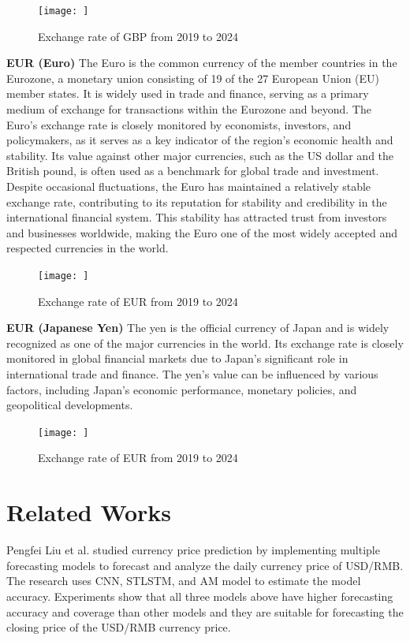 \documentclass{ieeeojies}
\begin{document}
\begin{figure}[h]
    \centering
    \texttt{[image: ]}
    \label{fig1:us_image}
    \caption{Exchange rate of GBP from 2019 to 2024}
\end{figure}



\raggedright
\bigskip
\textbf{EUR (Euro)}
\bigskip
\justify
The Euro is the common currency of the member countries in the Eurozone, a monetary union consisting of 19 of the 27 European Union (EU) member states. It is widely used in trade and finance, serving as a primary medium of exchange for transactions within the Eurozone and beyond. The Euro's exchange rate is closely monitored by economists, investors, and policymakers, as it serves as a key indicator of the region's economic health and stability. Its value against other major currencies, such as the US dollar and the British pound, is often used as a benchmark for global trade and investment. Despite occasional fluctuations, the Euro has maintained a relatively stable exchange rate, contributing to its reputation for stability and credibility in the international financial system. This stability has attracted trust from investors and businesses worldwide, making the Euro one of the most widely accepted and respected currencies in the world.
\begin{figure}[h]
    \centering
    \texttt{[image: ]}
    \caption{Exchange rate of EUR from 2019 to 2024}
    \label{fig2:euro_image}
\end{figure}


\bigskip
\textbf{EUR (Japanese Yen)}
\bigskip
\justify
The yen is the official currency of Japan and is widely recognized as one of the major currencies in the world. Its exchange rate is closely monitored in global financial markets due to Japan's significant role in international trade and finance. The yen's value can be influenced by various factors, including Japan's economic performance, monetary policies, and geopolitical developments.
\begin{figure}[h]
    \centering
    \texttt{[image: ]}
    \label{fig3:yen_image}
    \caption{Exchange rate of EUR from 2019 to 2024}
\end{figure}

\section{Related Works}
\justify
Pengfei Liu et al. \cite{rw1} studied currency price prediction by implementing multiple forecasting models to forecast and analyze the daily currency price of USD/RMB. The research uses CNN, STLSTM, and AM model to estimate the model accuracy. Experiments show that all three models above have higher forecasting accuracy and coverage than other models and they are suitable for forecasting the closing price of the USD/RMB currency price.
\end{document}
